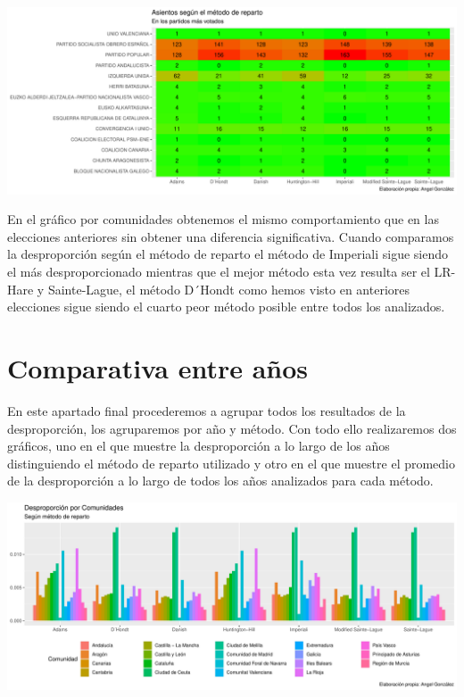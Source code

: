 \documentclass[12pt,a4paper,]{book}
\numberwithin{dummy}{section}
\theoremstyle{ocrenumbox}
\theoremstyle{blacknumex}
\theoremstyle{blacknumbox}
\theoremstyle{ocrenum}
\theoremstyle{ocrenum}
\begin{document}
\begin{center}\includegraphics[width=1\linewidth]{figurasR/unnamed-chunk-116-2} \end{center}

En el gráfico por comunidades obtenemos el mismo comportamiento que en
las elecciones anteriores sin obtener una diferencia significativa.
Cuando comparamos la desproporción según el método de reparto el método
de Imperiali sigue siendo el más desproporcionado mientras que el mejor
método esta vez resulta ser el LR-Hare y Sainte-Lague, el método D´Hondt
como hemos visto en anteriores elecciones sigue siendo el cuarto peor
método posible entre todos los analizados.

\hypertarget{comparativa-entre-auxf1os}{%
\section{Comparativa entre años}\label{comparativa-entre-auxf1os}}

En este apartado final procederemos a agrupar todos los resultados de la
desproporción, los agruparemos por año y método. Con todo ello
realizaremos dos gráficos, uno en el que muestre la desproporción a lo
largo de los años distinguiendo el método de reparto utilizado y otro en
el que muestre el promedio de la desproporción a lo largo de todos los
años analizados para cada método.

\begin{center}\includegraphics[width=1\linewidth]{figurasR/unnamed-chunk-117-1} \end{center}
\end{document}
